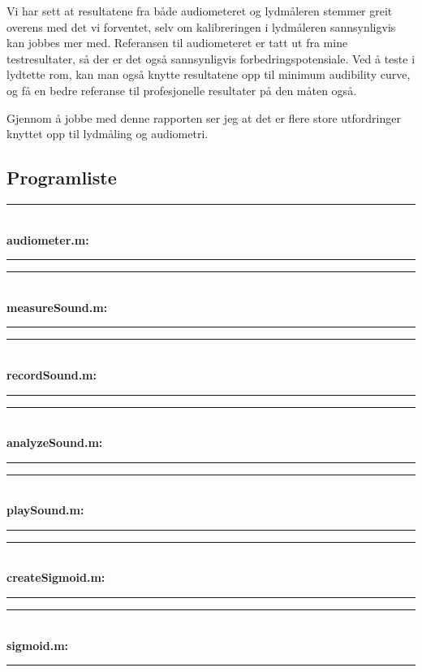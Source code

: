 \documentclass[norsk, twocolumn,letterpaper,11pt,fleqn]{extarticle}
\renewcommand{\thesubsection}{\Alph{subsection}.}
\renewcommand{\thesubsubsection}{\arabic{subsubsection}.}
\begin{document}
Vi har sett at resultatene fra både audiometeret og lydmåleren stemmer greit overens
med det vi forventet, selv om kalibreringen i lydmåleren sannsynligvis kan
jobbes mer med. Referansen til audiometeret er tatt ut fra mine testresultater,
så der er det også sannsynligvis forbedringspotensiale. Ved å teste i
lydtette rom, kan man også knytte resultatene opp til minimum audibility curve,
og få en bedre referanse til profesjonelle resultater på den måten også.

Gjennom å jobbe med denne rapporten ser jeg at det er flere store utfordringer
knyttet opp til lydmåling og audiometri.

\onecolumn
\appendix
\renewcommand{\thesubsection}{Vedlegg \Alph{subsection}:}
\renewcommand{\thesubsubsection}{\arabic{subsubsection}.}
\subsection{Programliste}
\label{sub:veda}
\rule{5cm}{0.1px}\\
{\bf audiometer.m:}


\rule{5cm}{0.1px}

\rule{5cm}{0.1px}\\
{\bf measureSound.m:}


\rule{5cm}{0.1px}

\rule{5cm}{0.1px}\\
{\bf recordSound.m:}


\rule{5cm}{0.1px}

\rule{5cm}{0.1px}\\
{\bf analyzeSound.m:}


\rule{5cm}{0.1px}

\rule{5cm}{0.1px}\\
{\bf playSound.m:}


\rule{5cm}{0.1px}

\rule{5cm}{0.1px}\\
{\bf createSigmoid.m:}


\rule{5cm}{0.1px}

\rule{5cm}{0.1px}\\
{\bf sigmoid.m:}


\rule{5cm}{0.1px}
\end{document}
